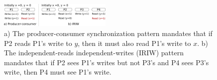 \begin{figure}[t]
  \centering
  \includegraphics[width=0.48\textwidth]{1_figures/intro-example.pdf}
  \caption{a) The producer-consumer synchronization pattern mandates that if P2 reads P1's write to $y$, then it must also read P1's write to $x$. b) The independent-reads independent-writes (IRIW) pattern mandates that if P2 sees P1's writes but not P3's and P4 sees P3's write, then P4 must see P1's write. }
  \label{fig:intro-ex}
\end{figure}